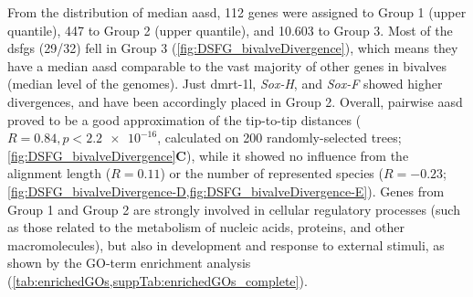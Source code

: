 From the distribution of median \gls{aasd}, 112 genes were assigned to Group 1 (\onepercent upper quantile), 447 to Group 2 (\fivepercent upper quantile), and 10.603 to Group 3. Most of the \glspl{dsfg} (29/32) fell in Group 3 (\cref{fig:DSFG_bivalveDivergence}), which means they have a median \gls{aasd} comparable to the vast majority of other genes in bivalves (median level of the genomes). Just \gls{dmrt-1l}, \textit{Sox-H}, and \textit{Sox-F} showed higher divergences, and have been accordingly placed in Group 2. Overall, pairwise \gls{aasd} proved to be a good approximation of the tip-to-tip distances ($R = 0.84, p < \num{2.2e-16}$, calculated on 200 randomly-selected trees; \cref{fig:DSFG_bivalveDivergence}\textbf{C}), while it showed no influence from the alignment length ($R = 0.11$) or the number of represented species ($R = -0.23$; \cref{fig:DSFG_bivalveDivergence-D,fig:DSFG_bivalveDivergence-E}). Genes from Group 1 and Group 2 are strongly involved in cellular regulatory processes (such as those related to the metabolism of nucleic acids, proteins, and other macromolecules), but also in development and response to external stimuli, as shown by the GO-term enrichment analysis (\cref{tab:enrichedGOs,suppTab:enrichedGOs_complete}).

